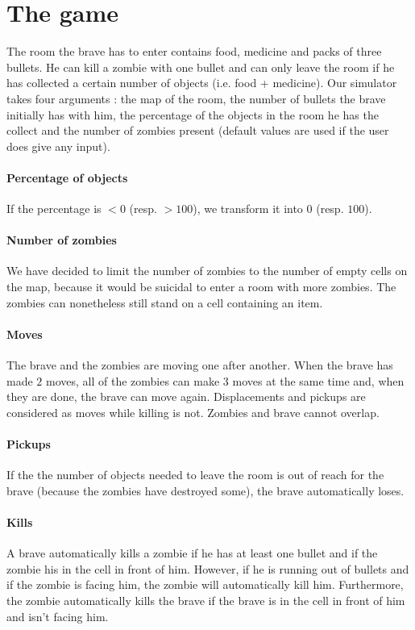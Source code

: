 \documentclass[11pt,a4paper]{article}
\begin{document}
\section{The game}

The room the brave has to enter contains food, medicine and packs of three bullets. He can kill a zombie with one bullet and can only leave the room if he has collected a certain number of objects (i.e. food + medicine). Our simulator takes four arguments : the map of the room, the number of bullets the brave initially has with him, the percentage of the objects in the room he has the collect and the number of zombies present (default values are used if the user does give any input).

\paragraph{Percentage of objects} If the percentage is $< 0$ (resp. $ > 100$), we transform it into $0$ (resp. $100$).

\paragraph{Number of zombies} We have decided to limit the number of zombies to the number of empty cells on the map, because it would be suicidal to enter a room with more zombies. The zombies can nonetheless still stand on a cell containing an item. 

\paragraph{Moves} The brave and the zombies are moving one after another. When the brave has made $2$ moves, all of the zombies can make $3$ moves at the same time and, when they are done, the brave can move again. Displacements and pickups are considered as moves while killing is not. Zombies and brave cannot overlap.

\paragraph{Pickups} If the the number of objects needed to leave the room is out of reach for the brave (because the zombies have destroyed some), the brave automatically loses. 

\paragraph{Kills} \label {kills} A brave automatically kills a zombie if he has at least one bullet and if the zombie his in the cell in front of him. However, if he is running out of bullets and if the zombie is facing him, the zombie will automatically kill him. Furthermore, the zombie automatically kills the brave if the brave is in the cell in front of him and isn't facing him.
\end{document}
